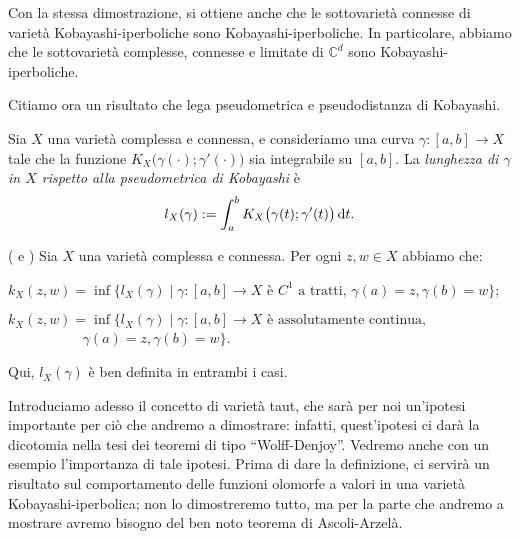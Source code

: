 \begin{oss} \label{kobisdist}
    Con la stessa dimostrazione, si ottiene anche che le sottovarietà connesse di varietà Kobayashi-iperboliche sono Kobayashi-iperboliche. In particolare, abbiamo che le sottovarietà complesse, connesse e limitate di $\mathbb{C}^d$ sono Kobayashi-iperboliche.
\end{oss}

Citiamo ora un risultato che lega pseudometrica e pseudodistanza di Kobayashi.

\begin{defn} \label{lung_X}
    Sia $X$ una varietà complessa e connessa, e consideriamo una curva $\gamma:[a,b] \longrightarrow X$ tale che la funzione $K_X\big(\gamma(\cdot);\gamma'(\cdot)\big)$ sia integrabile su $[a,b]$. La \textit{lunghezza di $\gamma$ in $X$ rispetto alla pseudometrica di Kobayashi} è
    $$l_X(\gamma):=\int_a^b K_X\big(\gamma(t);\gamma'(t)\big)\mathop{}\!\mathrm{d} t.$$
\end{defn}

\begin{thm} \label{lung_int}
    (\cite[Theorem 1]{Roy} e \cite[Theorem 3.1]{V}) Sia $X$ una varietà complessa e connessa. Per ogni $z,w \in X$ abbiamo che:
    \begin{nlist}
        \item $k_X(z,w)=\inf\{l_X(\gamma) \mid \gamma:[a,b] \longrightarrow X\text{ è $C^1$ a tratti, }\gamma(a)=z,\gamma(b)=w\}$;
        \item $k_X(z,w)=\inf\{l_X(\gamma) \mid \gamma:[a,b] \longrightarrow X\text{ è assolutamente continua,}$\\
        $\text{    }\qquad\qquad\,\,\,\,\gamma(a)=z,\gamma(b)=w\}$.
    \end{nlist}

    Qui, $l_X(\gamma)$ è ben definita in entrambi i casi.
\end{thm}

Introduciamo adesso il concetto di varietà taut, che sarà per noi un'ipotesi importante per ciò che andremo a dimostrare: infatti, quest'ipotesi ci darà la dicotomia nella tesi dei teoremi di tipo ``Wolff-Denjoy''. Vedremo anche con un esempio l'importanza di tale ipotesi. Prima di dare la definizione, ci servirà un risultato sul comportamento delle funzioni olomorfe a valori in una varietà Kobayashi-iperbolica; non lo dimostreremo tutto, ma per la parte che andremo a mostrare avremo bisogno del ben noto teorema di Ascoli-Arzelà.

